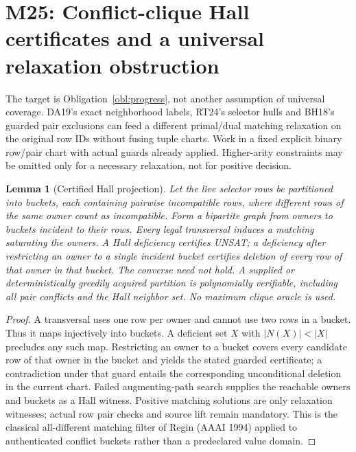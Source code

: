 \documentclass[11pt]{article}
\newtheorem{lemma}[theorem]{Lemma}
\begin{document}
\section{M25: Conflict-clique Hall certificates and a universal relaxation obstruction}\label{sec:m25}
The target is Obligation~\ref{obl:progress}, not another assumption of universal coverage. DA19's exact neighborhood labels, RT24's selector hulls and BH18's guarded pair exclusions can feed a different primal/dual matching relaxation on the original row IDs without fusing tuple charts. Work in a fixed explicit binary row/pair chart with actual guards already applied. Higher-arity constraints may be omitted only for a necessary relaxation, not for positive decision.
\begin{lemma}[Certified Hall projection]\label{lem:m25-hall}
Let the live selector rows be partitioned into buckets, each containing pairwise incompatible rows, where different rows of the same owner count as incompatible. Form a bipartite graph from owners to buckets incident to their rows. Every legal transversal induces a matching saturating the owners. A Hall deficiency certifies UNSAT; a deficiency after restricting an owner to a single incident bucket certifies deletion of every row of that owner in that bucket. The converse need not hold. A supplied or deterministically greedily acquired partition is polynomially verifiable, including all pair conflicts and the Hall neighbor set. No maximum clique oracle is used.
\end{lemma}
\begin{proof}
A transversal uses one row per owner and cannot use two rows in a bucket. Thus it maps injectively into buckets. A deficient set $X$ with $|N(X)|<|X|$ precludes any such map. Restricting an owner to a bucket covers every candidate row of that owner in the bucket and yields the stated guarded certificate; a contradiction under that guard entails the corresponding unconditional deletion in the current chart. Failed augmenting-path search supplies the reachable owners and buckets as a Hall witness. Positive matching solutions are only relaxation witnesses; actual row pair checks and source lift remain mandatory. This is the classical all-different matching filter of Regin (AAAI 1994) applied to authenticated conflict buckets rather than a predeclared value domain.
\end{proof}
\end{document}
